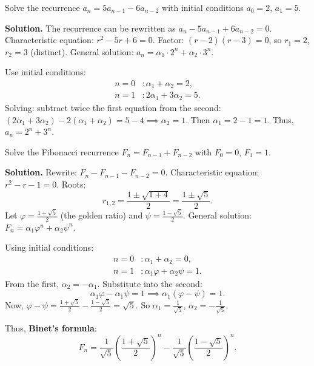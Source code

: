 \documentclass[11pt,a4paper]{article}
\begin{document}
\begin{example}
Solve the recurrence $a_n = 5a_{n-1} - 6a_{n-2}$ with initial conditions $a_0 = 2$, $a_1 = 5$.

\textbf{Solution.}
The recurrence can be rewritten as $a_n - 5a_{n-1} + 6a_{n-2} = 0$.
Characteristic equation: $r^2 - 5r + 6 = 0$.
Factor: $(r-2)(r-3) = 0$, so $r_1 = 2$, $r_2 = 3$ (distinct).
General solution: $a_n = \alpha_1 \cdot 2^n + \alpha_2 \cdot 3^n$.

Use initial conditions:
\begin{align*}
    n = 0 &: \alpha_1 + \alpha_2 = 2, \\
    n = 1 &: 2\alpha_1 + 3\alpha_2 = 5.
\end{align*}
Solving: subtract twice the first equation from the second: $(2\alpha_1 + 3\alpha_2) - 2(\alpha_1 + \alpha_2) = 5 - 4 \implies \alpha_2 = 1$. Then $\alpha_1 = 2 - 1 = 1$.
Thus, $a_n = 2^n + 3^n$.
\end{example}

\begin{example}
Solve the Fibonacci recurrence $F_n = F_{n-1} + F_{n-2}$ with $F_0 = 0$, $F_1 = 1$.

\textbf{Solution.} Rewrite: $F_n - F_{n-1} - F_{n-2} = 0$.
Characteristic equation: $r^2 - r - 1 = 0$.
Roots:
\begin{equation*}
    r_{1,2} = \frac{1 \pm \sqrt{1 + 4}}{2} = \frac{1 \pm \sqrt{5}}{2}.
\end{equation*}
Let $\varphi = \frac{1+\sqrt{5}}{2}$ (the golden ratio) and $\psi = \frac{1-\sqrt{5}}{2}$.
General solution: $F_n = \alpha_1 \varphi^n + \alpha_2 \psi^n$.

Using initial conditions:
\begin{align*}
    n = 0 &: \alpha_1 + \alpha_2 = 0, \\
    n = 1 &: \alpha_1 \varphi + \alpha_2 \psi = 1.
\end{align*}
From the first, $\alpha_2 = -\alpha_1$. Substitute into the second:
\begin{equation*}
    \alpha_1 \varphi - \alpha_1 \psi = 1 \implies \alpha_1 (\varphi - \psi) = 1.
\end{equation*}
Now, $\varphi - \psi = \frac{1+\sqrt{5}}{2} - \frac{1-\sqrt{5}}{2} = \sqrt{5}$.
So $\alpha_1 = \frac{1}{\sqrt{5}}$, $\alpha_2 = -\frac{1}{\sqrt{5}}$.

Thus, \textbf{Binet's formula}:
\begin{equation*}
    F_n = \frac{1}{\sqrt{5}}\left(\frac{1+\sqrt{5}}{2}\right)^n - \frac{1}{\sqrt{5}}\left(\frac{1-\sqrt{5}}{2}\right)^n.
\end{equation*}
\end{example}
\end{document}
